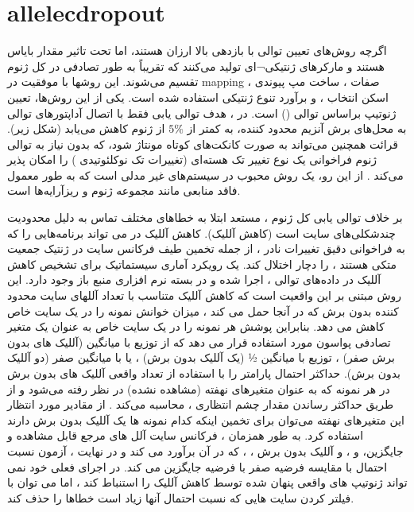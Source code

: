 \section{\gls{allelecdropout}}

اگرچه روش‌های تعیین توالی با بازدهی بالا \cite{hugo2007epithelial} ارزان هستند، اما تحت تاثیر مقدار بایاس هستند و مارکرهای ژنتیکی¬ای تولید می‌کنند که تقریباً به طور تصادفی در کل ژنوم تقسیم می‌شوند. این روشها با موفقیت در \gls{mapping} صفات \cite{nowell1976clonal, greaves2012clonal} ، ساخت مپ پیوندی \cite{sakr1993frequency, fearon1990genetic} ،  اسکن انتخاب  \cite{dentro2018portraits, waclaw2015spatial}،  و برآورد تنوع ژنتیکی \cite{de2006clonal} استفاده شده است. یکی از این روش‌ها، تعیین ژنوتیپ براساس توالی \cite{anderson2011genetic} () است. در ، هدف توالی یابی فقط با اتصال آداپتورهای توالی به محل‌های برش آنزیم محدود کننده، به کمتر از $5\%$ از ژنوم کاهش می‌یابد (شکل زیر).  قرائت  همچنین می‌تواند به صورت کانکت‌های کوتاه مونتاژ شود، که بدون نیاز به توالی ژنوم فراخوانی یک نوع تغییر تک هسته‌ای (تغییرات تک نوکلئوتیدی ) را امکان پذیر می‌کند \cite{hanahan2000hallmarks}. از این رو،  یک روش محبوب در سیستم‌های غیر مدلی است که به طور معمول فاقد منابعی مانند مجموعه ژنوم و ریزآرایه‌ها است.

بر خلاف توالی یابی كل ژنوم  ،  مستعد ابتلا به خطاهای مختلف تماس به دلیل محدودیت چندشكلی‌های سایت  است (کاهش آللیک). کاهش آللیک در  می تواند برنامه‌هایی را که به فراخوانی دقیق تغییرات نادر ، از جمله تخمین طیف فرکانس سایت در ژنتیک جمعیت متکی هستند ، را دچار اختلال کند. یک رویکرد آماری سیستماتیک برای تشخیص کاهش آللیک در داده‌های توالی  ، اجرا شده و  در بسته نرم افزاری منبع باز  وجود دارد.  این روش مبتنی بر این واقعیت است که کاهش آللیک متناسب با تعداد آللهای سایت محدود کننده بدون برش که در آنجا حمل می کند ، میزان خوانش نمونه را در یک سایت خاص کاهش می دهد. بنابراین  پوشش هر نمونه را در یک سایت خاص به عنوان یک متغیر تصادفی پواسون مورد استفاده قرار می دهد که از توزیع با میانگین \lr{$\lambda$} (آللیک های بدون برش صفر) ، توزیع با میانگین ½\lr{$\lambda$} (یک آللیک بدون برش) ، یا با میانگین صفر (دو آللیک بدون برش).  حداکثر احتمال پارامتر \lr{$\lambda$} را با استفاده از تعداد واقعی آللیک های بدون برش در هر نمونه که به عنوان متغیرهای نهفته (مشاهده نشده) در نظر رفته می‌شود و از طریق  حداکثر رساندن  مقدار چشم انتظاری ، محاسبه می‌کند . از مقادیر مورد انتظار این متغیرهای نهفته می‌توان برای تخمین اینکه کدام نمونه ها یک آللیک بدون برش دارند استفاده کرد. به طور همزمان ،  فرکانس سایت آلل های  مرجع قابل مشاهده و جایگزین،  و     ، و آللیک بدون برش ،   ، که در آن     برآورد می کند و در نهایت ، آزمون نسبت احتمال با مقایسه فرضیه صفر   با فرضیه  جایگزین می کند.   در اجرای فعلی خود نمی تواند ژنوتیپ های واقعی پنهان شده توسط کاهش آللیک را استنباط کند ، اما می توان با فیلتر کردن سایت هایی که نسبت احتمال آنها زیاد است خطاها را حذف کند.

